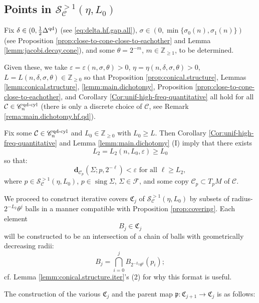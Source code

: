 \documentclass[11pt, letterpaper, reqno]{amsart}
\numberwithin{equation}{section}
\theoremstyle{remark}
\newcommand{\ZZ}{\mathbb{Z}}
\newcommand{\cC}{\mathcal{C}}
\newcommand{\cS}{\mathcal{S}}
\newcommand{\mbfd}{\mathbf{d}}
\newcommand{\sing}{\operatorname{sing}}
\newcommand{\eps}{\varepsilon}
\begin{document}
\subsection{Points in $\cS^{>1}_{\cC}(\eta, L_0)$} \label{sec:hf.qd.points}

Fix $\delta \in (0, \tfrac12 \Delta^{\textnormal{qd}}_{})$ (see \eqref{eq:delta.hf.gap.all}), $\sigma \in (0, \min \{ \sigma_0(n), \sigma_1(n) \})$ (see Proposition \ref{prop:close-to-cone-close-to-eachother} and Lemma \ref{lemm:jacobi.decay.cone}), and some $\theta = 2^{-m}$, $m \in \ZZ_{\geq 1}$, to be determined.

Given these, we take $\eps = \eps(n, \sigma, \theta) > 0$, $\eta = \eta(n, \delta, \sigma, \theta) > 0$, $L = L(n, \delta, \sigma, \theta) \in \ZZ_{\geq 0}$ so that Proposition \ref{prop:conical.structure}, Lemmas \ref{lemm:conical.structure}, \ref{lemm:main.dichotomy}, Proposition \ref{prop:close-to-cone-close-to-eachother}, and Corollary \ref{Cor:unif-high-freq-quantitative} all hold for all $\cC \in \mathscr{C}_n^{\textnormal{qd-cyl}}$ (there is only a discrete choice of $\cC$, see Remark \ref{rema:main.dichotomy.hf.qd}).

Fix some $\cC \in \mathscr{C}_n^{\textnormal{qd-cyl}}$ and $L_0 \in \ZZ_{\geq 0}$ with $L_0 \geq L$. Then Corollary \ref{Cor:unif-high-freq-quantitative} and Lemma \ref{lemm:main.dichotomy} (I) imply that there exists
\[ L_2 = L_2(n, L_0, \eps) \geq L_0 \]
so that:
\begin{equation} \label{eq:hf.qd.points.eps}
	\mbfd_{\cC_p}(\Sigma; p, 2^{-\ell}) < \eps \text{ for all } \ell \geq L_2,
\end{equation}
where $p \in \cS^{>1}_\cC(\eta, L_0)$, $p \in \sing \Sigma$, $\Sigma \in \mathscr{F}$, and some copy $\cC_p \subset T_p M$ of $\cC$.

We proceed to construct iterative covers $\mathfrak{C}_j$ of $\cS^{>1}_\cC(\eta, L_0)$ by subsets of radius-$2^{-L_2} \theta^j$ balls in a manner compatible with Proposition \ref{prop:covering}. Each element
\[ B_j \in \mathfrak{C}_j \]
will be constructed to be an intersection of a chain of balls with geometrically decreasing radii:
\[ B_j = \bigcap_{i=0}^j B_{2^{-L_2} \theta^i}(p_i); \]
cf. Lemma \ref{lemm:conical.structure.iter}'s (2) for why this format is useful. 

The construction of the various $\mathfrak{C}_j$ and the parent map $\mathfrak{p} : \mathfrak{C}_{j+1} \to \mathfrak{C}_j$ is as follows:
\end{document}
